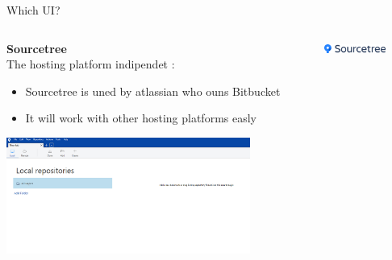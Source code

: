 \documentclass[10pt]{beamer}
\begin{document}
\begin{frame}[fragile]{Which UI?}
  \begin{columns}[T]
    \begin{column}{.8\textwidth}
  	\textbf{Sourcetree\\}
	The hosting platform indipendet :
	\begin{itemize}
		\item Sourcetree is uned by atlassian who ouns Bitbucket
		\item It will work with other hosting platforms easly
	\end{itemize}
	\includegraphics[width=8cm]{Figs/ST/ST_00}
    \end{column}
    \begin{column}{.2\textwidth}
	\includegraphics[width=2cm]{Figs/git/Sourcetree} \newline  \newline  \newline 
    \end{column}
  \end{columns}
\end{frame}
\end{document}
